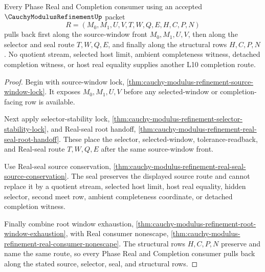 \begin{theorem}
\label{thm:cauchy-modulus-refinement-l10-completion-pullback}
Every Phase Real and Completion consumer using an accepted $\CauchyModulusRefinementUp$ packet
$$
R=(M_0,M_1,U,V,T,W,Q,E,H,C,P,N)
$$
pulls back first along the source-window front $M_0,M_1,U,V$, then along the selector and seal route $T,W,Q,E$, and finally along the structural rows $H,C,P,N$. No quotient stream, selected host limit, ambient completeness witness, detached completion witness, or host real equality supplies another L10 completion route.
\end{theorem}
\begin{proof}
Begin with source-window lock, \autoref{thm:cauchy-modulus-refinement-source-window-lock}. It exposes $M_0,M_1,U,V$ before any selected-window or completion-facing row is available.

Next apply selector-stability lock, \autoref{thm:cauchy-modulus-refinement-selector-stability-lock}, and Real-seal root handoff, \autoref{thm:cauchy-modulus-refinement-real-seal-root-handoff}. These place the selector, selected-window, tolerance-readback, and Real-seal route $T,W,Q,E$ after the same source-window front.

Use Real-seal source conservation, \autoref{thm:cauchy-modulus-refinement-real-seal-source-conservation}. The seal preserves the displayed source route and cannot replace it by a quotient stream, selected host limit, host real equality, hidden selector, second meet row, ambient completeness coordinate, or detached completion witness.

Finally combine root window exhaustion, \autoref{thm:cauchy-modulus-refinement-root-window-exhaustion}, with Real consumer nonescape, \autoref{thm:cauchy-modulus-refinement-real-consumer-nonescape}. The structural rows $H,C,P,N$ preserve and name the same route, so every Phase Real and Completion consumer pulls back along the stated source, selector, seal, and structural rows.
\end{proof}

